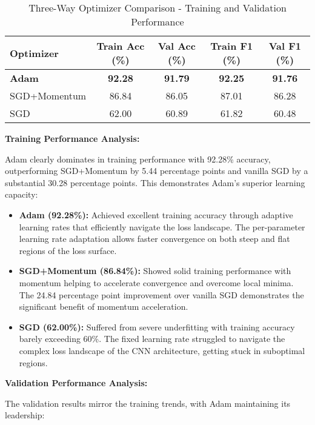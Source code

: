 \documentclass[12pt,a4paper]{article}
\begin{document}
\begin{table}[H]
\centering
\caption{Three-Way Optimizer Comparison - Training and Validation Performance}
\begin{tabular}{lcccc}
\toprule
\textbf{Optimizer} & \textbf{Train Acc (\%)} & \textbf{Val Acc (\%)} & \textbf{Train F1 (\%)} & \textbf{Val F1 (\%)} \\
\midrule
\textbf{Adam} & \textbf{92.28} & \textbf{91.79} & \textbf{92.25} & \textbf{91.76} \\
SGD+Momentum & 86.84 & 86.05 & 87.01 & 86.28 \\
SGD & 62.00 & 60.89 & 61.82 & 60.48 \\
\bottomrule
\end{tabular}
\end{table}

\textbf{Training Performance Analysis:}

Adam clearly dominates in training performance with 92.28\% accuracy, outperforming SGD+Momentum by 5.44 percentage points and vanilla SGD by a substantial 30.28 percentage points. This demonstrates Adam's superior learning capacity:

\begin{itemize}
    \item \textbf{Adam (92.28\%):} Achieved excellent training accuracy through adaptive learning rates that efficiently navigate the loss landscape. The per-parameter learning rate adaptation allows faster convergence on both steep and flat regions of the loss surface.
    
    \item \textbf{SGD+Momentum (86.84\%):} Showed solid training performance with momentum helping to accelerate convergence and overcome local minima. The 24.84 percentage point improvement over vanilla SGD demonstrates the significant benefit of momentum acceleration.
    
    \item \textbf{SGD (62.00\%):} Suffered from severe underfitting with training accuracy barely exceeding 60\%. The fixed learning rate struggled to navigate the complex loss landscape of the CNN architecture, getting stuck in suboptimal regions.
\end{itemize}

\textbf{Validation Performance Analysis:}

The validation results mirror the training trends, with Adam maintaining its leadership:
\end{document}
